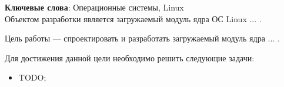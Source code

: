 \begin{essay}{}
    \noindent\textbf{Ключевые слова}: Операционные системы, Linux\\
        
    Объектом разработки является загружаемый модуль ядра ОС Linux ... .
    
    Цель работы --- спроектировать и разработать загружаемый модуль ядра ... .
    
    Для достижения данной цели необходимо решить следующие задачи:
    
    \begin{itemize}
        \item TODO;
    \end{itemize}
    
    
\end{essay}
